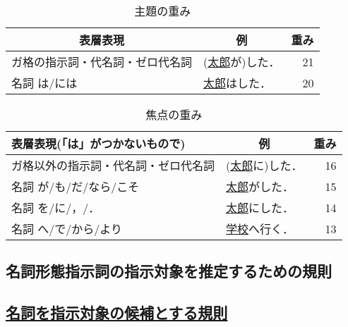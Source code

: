 \begin{table}[t]
  \caption{主題の重み}
  \label{fig:shudai_omomi}

\begin{center}
    \newcommand{\mn}[1]{}
\begin{tabular}[c]{|@{ }l@{ }|@{ }l@{ }|@{ }r@{ }|}\hline
  \multicolumn{1}{|c|}{表層表現} & \multicolumn{1}{c|}{例} 
& \multicolumn{1}{c|}{重み}
  \\\hline
  {ガ格の指示詞・代名詞・ゼロ代名詞} &
  (\underline{太郎}が)した．&21 \\\hline
名詞 は/には        &  \underline{太郎}はした．  &20 \\\hline
\end{tabular}
\end{center}
\end{table}

\begin{table}[t]
  \caption{焦点の重み}
  \label{fig:shouten_omomi}

\begin{center}
    \newcommand{\mn}[1]{}
\begin{tabular}[c]{|@{ }l@{ }|@{ }l@{ }|@{ }r@{ }|}\hline
{表層表現(「は」がつかないもので)} 
& \multicolumn{1}{c|}{例}   
& 重み \\\hline
{ガ格以外の指示詞・代名詞・ゼロ代名詞} & (\underline{太郎}に)した．& 16 \\\hline
{名詞 が/も/だ/なら/こそ} & \underline{太郎}がした．  & 15 \\\hline
名詞 を/に/，/．        & \underline{太郎}にした．  & 14 \\\hline
名詞 へ/で/から/より    & \underline{学校}へ行く．  & 13 \\\hline
\end{tabular}
\end{center}
\end{table}

\subsection{名詞形態指示詞の指示対象を推定するための規則}
\label{sec:meishi_siji}

\subsection*{\underline{名詞を指示対象の候補とする規則}}


